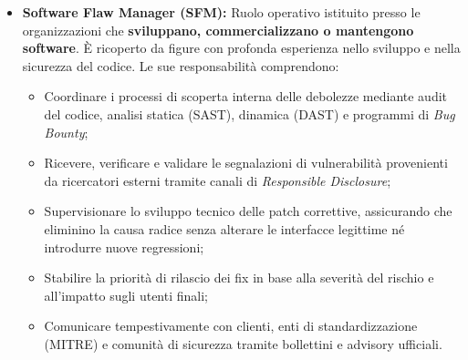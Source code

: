 \documentclass[../../main.tex]{subfiles}
\begin{document}
\begin{itemize}
    \item \textbf{Software Flaw Manager (SFM):} Ruolo operativo istituito presso le organizzazioni che \textbf{sviluppano, commercializzano o mantengono software}. È ricoperto da figure con profonda esperienza nello sviluppo e nella sicurezza del codice. Le sue responsabilità comprendono:
    \begin{itemize}
        \item Coordinare i processi di scoperta interna delle debolezze mediante audit del codice, analisi statica (SAST), dinamica (DAST) e programmi di \textit{Bug Bounty};
        \item Ricevere, verificare e validare le segnalazioni di vulnerabilità provenienti da ricercatori esterni tramite canali di \textit{Responsible Disclosure};
        \item Supervisionare lo sviluppo tecnico delle patch correttive, assicurando che eliminino la causa radice senza alterare le interfacce legittime né introdurre nuove regressioni;
        \item Stabilire la priorità di rilascio dei fix in base alla severità del rischio e all'impatto sugli utenti finali;
        \item Comunicare tempestivamente con clienti, enti di standardizzazione (MITRE) e comunità di sicurezza tramite bollettini e advisory ufficiali.
    \end{itemize}
    

\end{itemize}
\end{document}
